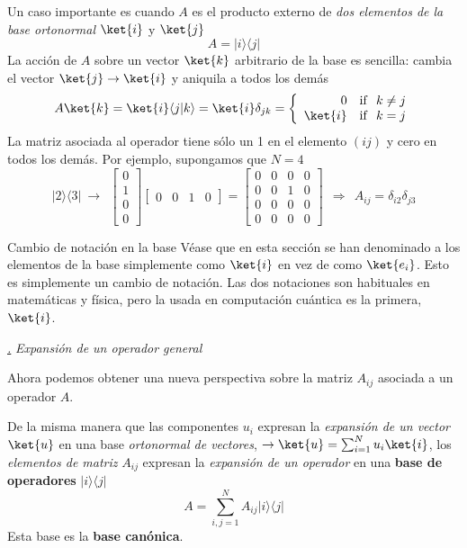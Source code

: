 \documentclass[a4paper,11pt]{book} %
\numberwithin{equation}{chapter}
\newcommand{\braket}[2]{\langle #1|#2\rangle}
\newcommand{\ketbra}[2]{| #1\rangle \! \langle #2|}
\def\subsubiContadorIt{\par\addtocounter{subsubsection}{1}\underline{\it\thesubsubsection.}\hskip0.5cm \setcounter{subsubsubsectionIt}{0}}
\newcommand{\SubsubiIt}[1]{
		\subsubiContadorIt \textit{#1}
	}
\newcounter{subsubsubsectionIt}[subsubsection]
\begin{document}
Un caso importante es cuando $A$ es el producto externo de \textit{dos elementos de la base ortonormal} $\ket{i}$ y $\ket{j}$ 
	\begin{equation}
	A = \ketbra{i}{j}
	\end{equation}
La acción de $A$ sobre un vector $\ket{k}$ arbitrario de la base es sencilla:  cambia el vector $\ket{j}\to \ket{i}$ y aniquila a todos los demás
	\begin{equation}
	A \ket{k} = \ket{i}\braket{j}{k} = \ket{i} \delta_{jk} = \left\{ \begin{array}{rl}
0 & {\rm if} ~~k\neq j \\ \ket{i} & {\rm if} ~~ k=j \end{array} \right.
	\end{equation}
La matriz asociada al operador  tiene sólo un 1 en el elemento $(ij)$ y cero en todos los demás. Por ejemplo, supongamos que 
$N=4$ 
	\begin{equation}
	\ketbra{2}{3} ~\to ~~
 \begin{bmatrix} 0 \\ 1 \\ 0 \\ 0 \end{bmatrix}\begin{bmatrix} 0 & 0 & 1 & 0 \end{bmatrix} = 
\begin{bmatrix}
0 &  0 & 0 &  0 \\  0 &  0 & 1&  0 \\ 0 &  0 & 0 &  0 \\ 0 &  0 & 0 &  0
\end{bmatrix} ~~\Rightarrow ~~ A_{ij} = \delta_{i2}\delta_{j3}
	\end{equation}

	\begin{mybox_blue}{Cambio de notación en la base}
	Véase que en esta sección se han denominado a los elementos de la base simplemente como $\ket{i}$ en vez de como $\ket{e_i}$. Esto es simplemente un cambio de notación. Las dos notaciones son habituales en matemáticas y física, pero la usada en computación cuántica es la primera, $\ket{i}$.
	\end{mybox_blue}

			\SubsubiIt{Expansión de un operador general}

Ahora podemos obtener una nueva perspectiva sobre la matriz $A_{ij}$ asociada a un operador $A$. 
\begin{mybox_gray2}{}
De la misma manera que las componentes $u_i$ expresan la \textit{expansión de un vector} $\ket{u}$ en una base \textit{ortonormal de vectores},  $\to \ket{u} = \sum_{i=1}^N u_i \ket{i}$, los \textit{elementos de matriz} $A_{ij}$ expresan la \textit{expansión de un operador} en una \textbf{base de operadores} $\ketbra{i}{j}$
	\begin{equation} \label{ec_formalismo_base_operadores}
 		A= \sum_{i,j=1}^N A_{ij} \ketbra{i}{j} 
 	\end{equation} 
Esta base es la \textbf{base canónica}.
\end{mybox_gray2}
\end{document}
